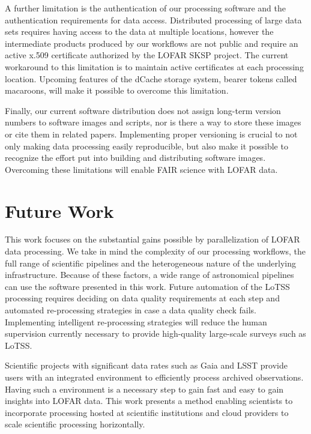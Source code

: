 A further limitation is the authentication of our processing software and the authentication requirements for data access. Distributed processing of large data sets requires having access to the data at multiple locations, however the intermediate products produced by our workflows are not public and require an active x.509 certificate authorized by the LOFAR SKSP project. The current workaround to this limitation is to maintain active certificates at each processing location. Upcoming features of the dCache storage system, bearer tokens called macaroons, will make it possible to overcome this limitation.

Finally, our current software distribution does not assign long-term version numbers to software images and scripts, nor is there a way to store these images or cite them in related papers. Implementing proper versioning is crucial to not only making data processing easily reproducible, but also make it possible to recognize the effort put into building and distributing software images. Overcoming these limitations will enable FAIR science with LOFAR data\citep{wilkinson2016fair}.


\section{Future Work}

This work focuses on the substantial gains possible by parallelization of LOFAR data processing. We take in mind the complexity of our processing workflows, the full range of scientific pipelines and the heterogeneous nature of the underlying infrastructure. Because of these factors, a wide range of astronomical pipelines can use the software presented in this work. Future automation of the LoTSS processing requires deciding on data quality requirements at each step and automated re-processing strategies in case a data quality check fails. Implementing intelligent re-processing strategies will reduce the human supervision currently necessary to provide high-quality large-scale surveys such as LoTSS. 

Scientific projects with significant data rates such as Gaia and LSST provide users with an integrated environment to efficiently process archived observations. Having such a environment is a necessary step to gain fast and easy to gain insights into LOFAR data. This work presents a method enabling scientists to incorporate processing hosted at scientific institutions and cloud providers to scale scientific processing horizontally. 


